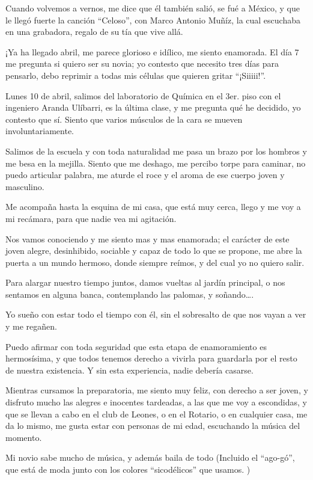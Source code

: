\documentclass[letterpaper, 12pt]{book}
\begin{document}
Cuando volvemos a vernos, me dice que él también salió, se fué a  México, y que le llegó fuerte la canción ``Celoso'', con Marco Antonio Muñíz, la cual escuchaba en una grabadora, regalo de su tía que vive allá. 

¡Ya ha llegado abril, me parece glorioso e idílico, me siento enamorada. El día 7 me pregunta si quiero ser su novia; yo contesto que necesito tres días para pensarlo, debo reprimir a todas mis células que quieren gritar ``¡Siiiii!''.

Lunes 10 de abril, salimos del laboratorio de Química en el 3er. piso con el ingeniero Aranda Ulíbarri, es la última clase, y me pregunta qué he decidido, yo contesto que sí. Siento que varios músculos de la cara se mueven involuntariamente.

Salimos de la escuela y con toda naturalidad me pasa un brazo por los hombros y me besa en la mejilla. Siento que me deshago, me percibo torpe para caminar, no puedo articular palabra, me aturde el roce y el aroma de ese cuerpo joven y masculino.

Me acompaña hasta la esquina de mi casa, que está muy cerca, llego y me voy a mi recámara, para que nadie vea mi agitación.

Nos vamos conociendo y me siento mas y mas enamorada; el carácter de este joven alegre, desinhibido, sociable y capaz de todo lo que se propone, me abre la puerta a un mundo hermoso, donde siempre reímos, y del cual yo no quiero salir.

Para alargar nuestro tiempo juntos, damos vueltas al jardín principal, o nos sentamos en alguna banca, contemplando las palomas, y soñando\ldots.

Yo sueño con estar todo el tiempo con él, sin el sobresalto de que nos vayan a ver y me regañen.

Puedo afirmar con toda seguridad que esta etapa de enamoramiento es hermosísima, y que todos tenemos derecho a vivirla para guardarla por el resto de nuestra existencia. Y sin esta experiencia, nadie debería casarse.

Mientras cursamos la preparatoria, me siento muy feliz, con derecho a ser joven, y disfruto mucho las alegres e inocentes tardeadas, a las que me voy a escondidas, y que se llevan a cabo en el club de Leones, o en el Rotario, o en cualquier casa, me da lo mismo, me gusta estar con personas de mi edad, escuchando la música del momento. 

Mi novio sabe mucho de música, y además baila de todo (Incluido el  ``ago-gó'', que está de moda junto con los colores ``sicodélicos'' que usamos. )
\end{document}

